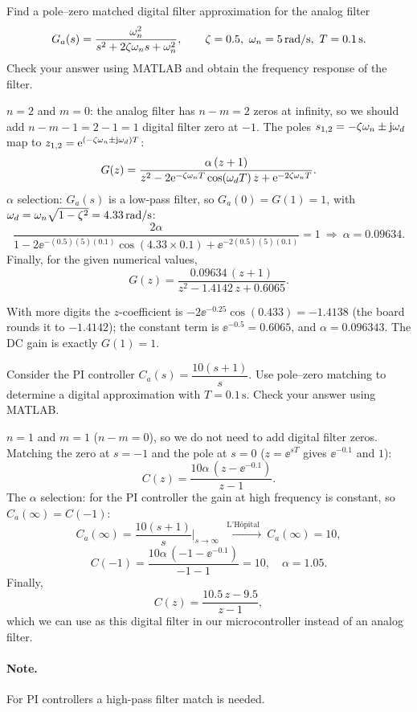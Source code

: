 \begin{example}
Find a pole--zero matched digital filter approximation for the analog filter
\[
  G_a(s)=\frac{\wn^{2}}{s^{2}+2\zeta\wn s+\wn^{2}},\qquad\zeta=0.5,\ \wn=5\,\mathrm{rad/s},\ T=0.1\,\mathrm{s}.
\]
Check your answer using MATLAB and obtain the frequency response of the filter.

$n=2$ and $m=0$: the analog filter has $n-m=2$ zeros at infinity, so we should add $n-m-1=2-1=1$ digital filter
zero at $-1$. The poles $s_{1,2}=-\zeta\omega_n\pm\mathrm{j}\omega_d$ map to $z_{1,2}=\mathrm{e}^{(-\zeta\omega_n\pm\mathrm{j}\omega_d)T}$:
\[
  G(z)=\frac{\alpha\,(z+1)}{z^{2}-2\mathrm{e}^{-\zeta\omega_n T}\cos(\omega_d T)\,z+\mathrm{e}^{-2\zeta\omega_n T}}.
\]
$\alpha$ selection: $G_a(s)$ is a low-pass filter, so $G_a(0)=G(1)=1$, with $\omega_d=\omega_n\sqrt{1-\zeta^{2}}=4.33\,\mathrm{rad/s}$:
\[
  \frac{2\alpha}{1-2\ee^{-(0.5)(5)(0.1)}\cos(4.33\times0.1)+\ee^{-2(0.5)(5)(0.1)}}=1\ \Rightarrow\ \alpha=0.09634.
\]
Finally, for the given numerical values,
\[
  G(z)=\frac{0.09634\,(z+1)}{z^{2}-1.4142\,z+0.6065}.
\]
\end{example}
\begin{remark}[added]
With more digits the $z$-coefficient is $-2\ee^{-0.25}\cos(0.433)=-1.4138$ (the board rounds it to $-1.4142$); the
constant term is $\ee^{-0.5}=0.6065$, and $\alpha=0.096343$. The DC gain is exactly $G(1)=1$.
\end{remark}

\begin{example}[PI controller]
Consider the PI controller $C_a(s)=\dfrac{10(s+1)}{s}$. Use pole--zero matching to determine a digital
approximation with $T=0.1\,\mathrm{s}$. Check your answer using MATLAB.

$n=1$ and $m=1$ ($n-m=0$), so we do not need to add digital filter zeros. Matching the zero at $s=-1$ and the pole at
$s=0$ ($z=\ee^{sT}$ gives $\ee^{-0.1}$ and $1$):
\[
  C(z)=\frac{10\alpha\,(z-\ee^{-0.1})}{z-1}.
\]
The $\alpha$ selection: for the PI controller the gain at high frequency is constant, so $C_a(\infty)=C(-1)$:
\[
  C_a(\infty)=\frac{10(s+1)}{s}\Big|_{s\to\infty}\ \xrightarrow{\ \text{L'H\^opital}\ }\ C_a(\infty)=10,
\]
\[
  C(-1)=\frac{10\alpha\,(-1-\ee^{-0.1})}{-1-1}=10,\quad\alpha=1.05.
\]
Finally,
\[
  C(z)=\frac{10.5\,z-9.5}{z-1},
\]
which we can use as this digital filter in our microcontroller instead of an analog filter.
\end{example}
\paragraph{Note.} For PI controllers a high-pass filter match is needed.

